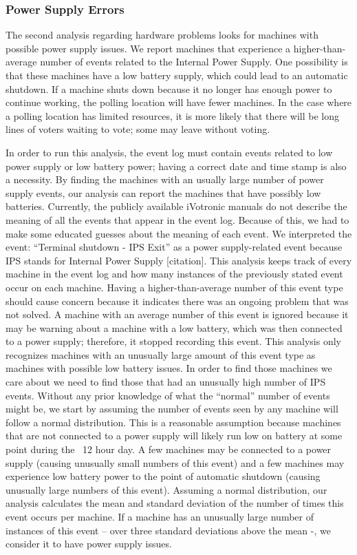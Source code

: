 \subsubsection{Power Supply Errors}
The second analysis regarding hardware problems looks for machines with possible power supply issues.  We report machines that experience a higher-than-average number of events related to the Internal Power Supply. One possibility is that these machines have a low battery supply, which could lead to an automatic shutdown.  If a machine shuts down because it no longer has enough power to continue working, the polling location will have fewer machines.  In the case where a polling location has limited resources, it is more likely that there will be long lines of voters waiting to vote; some may leave without voting.  

In order to run this analysis, the event log must contain events related to low power supply or low battery power; having a correct date and time stamp is also a necessity.  By finding the machines with an usually large number of power supply events, our analysis can report the machines that have possibly low batteries.  Currently, the publicly available iVotronic manuals do not describe the meaning of all the events that appear in the event log.  Because of this, we had to make some educated guesses about the meaning of each event.  We interpreted the event: \textquotedblleft Terminal shutdown - IPS Exit\textquotedblright \hspace{1 mm} as a power supply-related event because IPS stands for Internal Power Supply [citation].  This analysis keeps track of every machine in the event log and how many instances of the previously stated event occur on each machine.  Having a higher-than-average number of this event type should cause concern because it indicates there was an ongoing problem that was not solved. A machine with an average number of this event is ignored because it may be warning about a machine with a low battery, which was then connected to a power supply; therefore, it stopped recording this event. This analysis only recognizes machines with an unusually large amount of this event type as machines with possible low battery issues. In order to find those machines we care about we need to find those that had an unusually high number of IPS events. Without any prior knowledge of what the “normal” number of events might be, we start by assuming the number of events seen by any machine will follow a normal distribution. This is a reasonable assumption because machines that are not connected to a power supply will likely run low on battery at some point during the ~12 hour day. A few machines may be connected to a power supply (causing unusually small numbers of this event) and a few machines may experience low battery power to the point of automatic shutdown (causing unusually large numbers of this event).  Assuming a normal distribution, our analysis calculates the mean and standard deviation of the number of times this event occurs per machine.  If a machine has an unusually large number of instances of this event – over three standard deviations above the mean -, we consider it to have power supply issues.    

